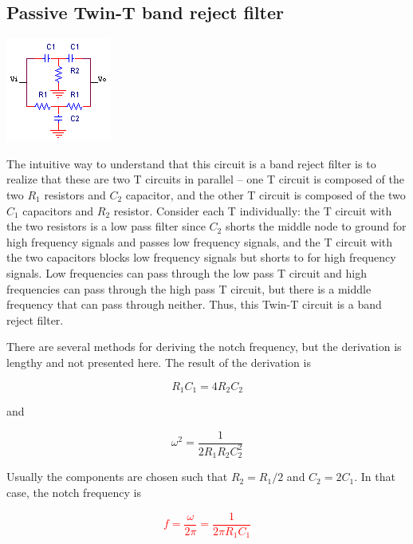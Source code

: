 \subsection{Passive Twin-T band reject filter}
\begin{center}
	\includegraphics{schematics/passiveTwinTbandrejectfilter.PNG}
\end{center}
The intuitive way to understand that this circuit is a band reject filter is to realize that these are two T circuits in parallel -- one T circuit is composed of the two $R_1$ resistors and $C_2$ capacitor, and the other T circuit is composed of the two $C_1$ capacitors and $R_2$ resistor.
Consider each T individually:
the T circuit with the two resistors is a low pass filter since $C_2$ shorts the middle node to ground for high frequency signals and passes low frequency signals, and the T circuit with the two capacitors blocks low frequency signals but shorts \vin to \vout for high frequency signals.
Low frequencies can pass through the low pass T circuit and high frequencies can pass through the high pass T circuit, but there is a middle frequency that can pass through neither.
Thus, this Twin-T circuit is a band reject filter.

There are several methods for deriving the notch frequency, but the derivation is lengthy and not presented here.
The result of the derivation \autocite[see][]{cr-bond-twin-t-notch} is

\begin{equation}
	R_1 C_1 = 4R_2C_2
\end{equation}

and

\begin{equation}
\omega^{2} = \frac{1}{2 R_1 R_2 C_2^2}
\end{equation}

Usually the components are chosen such that $R_2 = R_1/2$ and $C_2 = 2C_1$.
In that case, the notch frequency is

\textcolor{red}{
\begin{equation}
f = \frac{\omega}{2\pi} = \frac{1}{2\pi R_1C_1}
\label{eq:passiveTwinTnotchfreq}
\end{equation}
}

